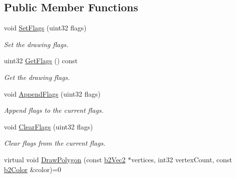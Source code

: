 \subsection*{Public Member Functions}
\begin{DoxyCompactItemize}
\item 
\hypertarget{classb2_draw_ac2bbe31595478690e44de4ff1e7f347e}{void \hyperlink{classb2_draw_ac2bbe31595478690e44de4ff1e7f347e}{Set\-Flags} (uint32 flags)}\label{classb2_draw_ac2bbe31595478690e44de4ff1e7f347e}

\begin{DoxyCompactList}\small\item\em Set the drawing flags. \end{DoxyCompactList}\item 
\hypertarget{classb2_draw_acadab1a12ec06541814f6118950aa998}{uint32 \hyperlink{classb2_draw_acadab1a12ec06541814f6118950aa998}{Get\-Flags} () const }\label{classb2_draw_acadab1a12ec06541814f6118950aa998}

\begin{DoxyCompactList}\small\item\em Get the drawing flags. \end{DoxyCompactList}\item 
\hypertarget{classb2_draw_acc2fd4648ee0a65574770c64528f7166}{void \hyperlink{classb2_draw_acc2fd4648ee0a65574770c64528f7166}{Append\-Flags} (uint32 flags)}\label{classb2_draw_acc2fd4648ee0a65574770c64528f7166}

\begin{DoxyCompactList}\small\item\em Append flags to the current flags. \end{DoxyCompactList}\item 
\hypertarget{classb2_draw_afc240b71f4ba8c17440d6ed526d4e22e}{void \hyperlink{classb2_draw_afc240b71f4ba8c17440d6ed526d4e22e}{Clear\-Flags} (uint32 flags)}\label{classb2_draw_afc240b71f4ba8c17440d6ed526d4e22e}

\begin{DoxyCompactList}\small\item\em Clear flags from the current flags. \end{DoxyCompactList}\item 
\hypertarget{classb2_draw_acd5427d1d2e7d19f1b34ad3620134d28}{virtual void \hyperlink{classb2_draw_acd5427d1d2e7d19f1b34ad3620134d28}{Draw\-Polygon} (const \hyperlink{structb2_vec2}{b2\-Vec2} $\ast$vertices, int32 vertex\-Count, const \hyperlink{structb2_color}{b2\-Color} \&color)=0}\label{classb2_draw_acd5427d1d2e7d19f1b34ad3620134d28}


\end{DoxyCompactItemize}
